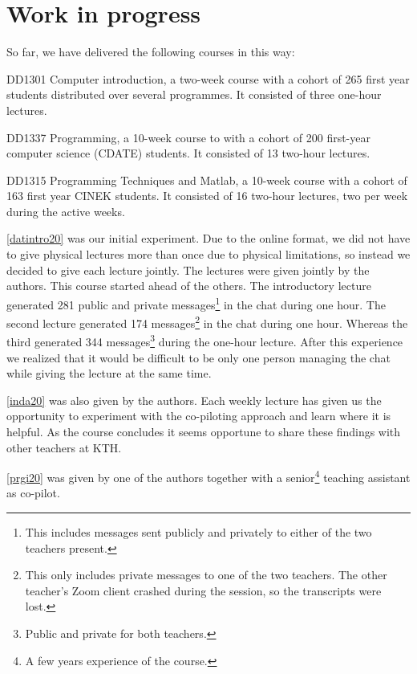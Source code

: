 \documentclass{article}
\begin{document}
\section*{Work in progress}

So far, we have delivered the following courses in this way:
\begin{courses}
  \item\label{datintro20} DD1301 Computer introduction, a two-week course with 
    a cohort of 265 first year students distributed over several programmes.
    It consisted of three one-hour lectures.

  \item\label{inda20} DD1337 Programming, a 10-week course to with a cohort of 
    200 first-year computer science (CDATE) students.
    It consisted of 13 two-hour lectures.

  \item\label{prgi20} DD1315 Programming Techniques and Matlab, a 10-week 
    course with a cohort of 163 first year CINEK students.
    It consisted of 16 two-hour lectures, two per week during the active weeks.
\end{courses}

\ref{datintro20} was our initial experiment.
Due to the online format, we did not have to give physical lectures more than 
once due to physical limitations, so instead we decided to give each lecture 
jointly.
The lectures were given jointly by the authors.
This course started ahead of the others.
The introductory lecture generated
281
public and private messages\footnote{%
  This includes messages sent publicly and privately to either of the two 
  teachers present.
} in the chat during one hour.
The second lecture generated
174
messages\footnote{%
  This only includes private messages to one of the two teachers.
  The other teacher's Zoom client crashed during the session, so the 
  transcripts were lost.
} in the chat during one hour.
Whereas the third generated
344
messages\footnote{%
  Public and private for both teachers.
} during the one-hour lecture.
After this experience we realized that it would be difficult to be only one 
person managing the chat while giving the lecture at the same time.

\ref{inda20} was also given by the authors.
Each weekly lecture has given us the opportunity to experiment with the 
co-piloting approach and learn where it is helpful.
As the course concludes it seems opportune to share these findings with other 
teachers at KTH.

\ref{prgi20} was given by one of the authors together with a senior\footnote{%
  A few years experience of the course.
} teaching assistant as co-pilot.
\end{document}
